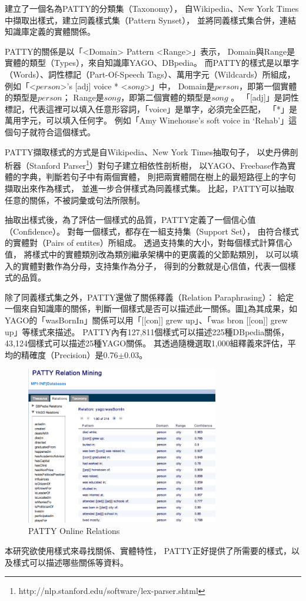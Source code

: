 \cite{patty,patty2012}建立了一個名為PATTY的分類集（Taxonomy），
自Wikipedia、New York Times中擷取出樣式，建立同義樣式集（Pattern Synset），
並將同義樣式集合併，連結知識庫定義的實體關係。

PATTY的關係是以「<Domain> Pattern <Range>」表示，
Domain與Range是實體的類型（Types），來自知識庫YAGO、DBpedia。
而PATTY的樣式是以單字（Words）、詞性標記（Part-Of-Speech Tags）、萬用字元（Wildcards）所組成，
例如「<$person$>'s [adj] voice * <$song$>」中，
Domain是$person$，即第一個實體的類型是$person$；
Range是$song$，即第二個實體的類型是$song$ 。
「[adj]」是詞性標記，代表這裡可以填入任意形容詞，「voice」是單字，必須完全匹配，
「*」是萬用字元，可以填入任何字。
例如「Amy Winehouse's soft voice in `Rehab'」這個句子就符合這個樣式。

PATTY擷取樣式的方式是自Wikipedia、New York Times抽取句子，
以史丹佛剖析器（Stanford Parser\footnote{http://nlp.stanford.edu/software/lex-parser.shtml}）對句子建立相依性剖析樹，
以YAGO、Freebase作為實體的字典，判斷若句子中有兩個實體，
則把兩實體間在樹上的最短路徑上的字句擷取出來作為樣式，
並進一步合併樣式為同義樣式集。
比起\cite{reverb}，PATTY可以抽取任意的關係，不被詞彙或句法所限制。

抽取出樣式後，為了評估一個樣式的品質，PATTY定義了一個信心值（Confidence）。
對每一個樣式，都存在一組支持集（Support Set），
由符合樣式的實體對（Pairs of entites）所組成。
透過支持集的大小，對每個樣式計算信心值，
將樣式中的實體類別改為類別繼承架構中的更廣義的父節點類別，
以可以填入的實體對數作為分母，支持集作為分子，
得到的分數就是心信值，代表一個樣式的品質。

除了同義樣式集之外，PATTY還做了關係釋義（Relation Paraphrasing）：
給定一個來自知識庫的關係，判斷一個樣式是否可以描述此一關係。圖\ref{i:patty-online}為其成果，如YAGO的「wasBornIn」關係可以用「[[con]] grew up」、「was bron [[con]] grew up」等樣式來描述。
PATTY內有127,811個樣式可以描述225種DBpedia關係，43,124個樣式可以描述25種YAGO關係。
其透過隨機選取1,000組釋義來評估，平均的精確度（Precision）是0.76$\pm$0.03。

\begin{figure}
    \centering
    \includegraphics[width=0.75\textwidth]{images/02-patty-online}
    \caption{PATTY Online Relations}
    \label{i:patty-online}
\end{figure}

本研究欲使用樣式來尋找關係、實體特性，
PATTY正好提供了所需要的樣式，以及樣式可以描述哪些關係等資料。

